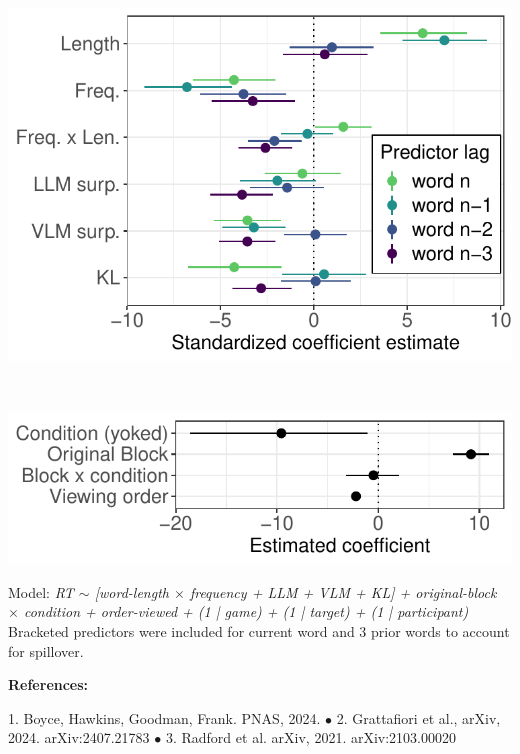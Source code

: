 \documentclass[11pt,a4paper]{article}
\begin{document}
\begin{minipage}{.5\textwidth}
\includegraphics[width=\textwidth]{word_preds.pdf} 
	
\end{minipage}
~~
\begin{minipage}{.45\textwidth}
	\begin{small}

		
		\includegraphics[width=\textwidth]{other_preds.pdf} 
		
		\vspace{2pt}
		
		Model: \textit{RT $\sim$ [word-length $\times$ frequency + LLM + VLM + KL] +  original-block $\times$ condition + order-viewed + (1 | game) + (1 | target) + (1 | participant)  } Bracketed predictors were included for current word and 3 prior words to account for spillover. 
		
	\end{small}
	
\end{minipage}

	\bigskip

\begin{minipage}{\textwidth}
	\vspace{5pt}
	\begin{small} \textbf{References:}%
		
1. Boyce, Hawkins, Goodman, Frank. PNAS, 2024. $\bullet$
2. Grattafiori et al., arXiv, 2024. arXiv:2407.21783 $\bullet$
3. Radford et al. arXiv, 2021. arXiv:2103.00020 

\end{small}
\end{minipage}
\end{document}

